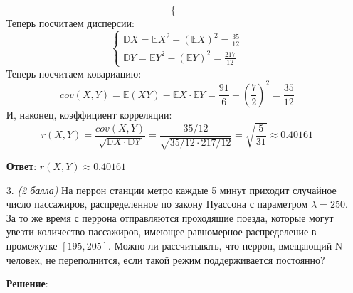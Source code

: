 \documentclass{article}
\begin{document}
\begin{enumerate}
\begin{equation}
\begin{cases}
  \end{cases}
\end{equation}
Теперь посчитаем дисперсии:
\begin{equation}
  \begin{cases}
    \mathbb{D}X = \mathbb{E}X^2 - (\mathbb{E}X)^2 = \frac{35}{12} \\
    \mathbb{D}Y = \mathbb{E}Y^2 - (\mathbb{E}Y)^2 = \frac{217}{12}
  \end{cases}
\end{equation}
Теперь посчитаем ковариацию:
\begin{equation}
  cov (X, Y) = \mathbb{E}(XY) - \mathbb{E}X \cdot \mathbb{E}Y = \frac{91}{6} - \left(\frac{7}{2}\right)^2 = \frac{35}{12}
\end{equation}
И, наконец, коэффициент корреляции:
\begin{equation}
  r (X, Y) = \dfrac{cov (X, Y)}{\sqrt{\mathbb{D}X \cdot \mathbb{D}Y}} = \dfrac{35/12}{\sqrt{35/12 \cdot 217/12}} = \sqrt{\frac{5}{31}} \approx 0.40161
\end{equation}

\textbf{Ответ}:
$r (X, Y) \approx 0.40161$

\item[3.] \textit{(2 балла)} На перрон станции метро каждые 5 минут приходит случайное число пассажиров, распределенное по закону Пуассона с параметром $\lambda = 250$. За то же время с перрона отправляются проходящие поезда, которые могут увезти количество пассажиров, имеющее равномерное распределение в промежутке $[195, 205]$. Можно ли рассчитывать, что перрон, вмещающий N человек, не переполнится, если такой режим поддерживается постоянно?

\textbf{Решение}:


\end{enumerate}
\end{document}
